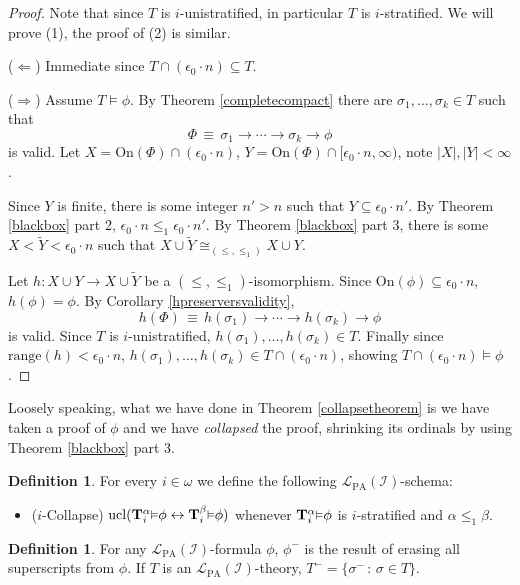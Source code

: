 \documentclass[reqno]{article}
\theoremstyle{definition}
\newtheorem{definition}[theorem]{Definition}
\def\L{\mathscr{L}}
\def\T{\mathbf{T}}
\def\LPA{\L_{\mathrm{PA}}}
\def\indset{\mathcal I}
\def\onset{\mathrm{On}}
\newcommand{\Prr}[2]{\T^{#1}_{#2}\mbox{\small${\vDash}$}}
\newcommand{\ucl}[1]{\mathrm{ucl}(#1)}
\begin{document}
\begin{proof}
Note that since $T$ is $i$-unistratified, in particular $T$ is $i$-stratified.
We will prove (1), the proof of (2) is similar.
\item
($\Leftarrow$) Immediate since $T\cap(\epsilon_0\cdot n)\subseteq T$.

\item
($\Rightarrow$)
Assume $T\models\phi$.
By Theorem \ref{completecompact} there are $\sigma_1,\ldots,\sigma_k\in T$
such that
\[
\Phi \,\equiv\, \sigma_1\rightarrow\cdots\rightarrow \sigma_k\rightarrow\phi
\]
is valid.
Let $X=\onset(\Phi)\cap(\epsilon_0\cdot n)$, $Y=\onset(\Phi)\cap[\epsilon_0\cdot n,\infty)$, note $|X|,|Y|<\infty$.

Since $Y$ is finite, there is some integer $n'>n$ such that $Y\subseteq\epsilon_0\cdot n'$.
By Theorem \ref{blackbox} part 2, $\epsilon_0\cdot n\leq_1\epsilon_0\cdot n'$.
By Theorem \ref{blackbox} part 3, there is some $X<\widetilde Y<\epsilon_0\cdot n$ such that
$X\cup\widetilde Y\cong_{(\leq,\leq_1)}X\cup Y$.

Let $h:X\cup Y\to X\cup\widetilde Y$ be a $(\leq,\leq_1)$-isomorphism.
Since $\onset(\phi)\subseteq\epsilon_0\cdot n$, $h(\phi)=\phi$.
By Corollary \ref{hpreserversvalidity},
\[
h(\Phi)\,\equiv\, h(\sigma_1)\rightarrow\cdots\rightarrow h(\sigma_k)\rightarrow \phi
\]
is valid.
Since $T$ is $i$-unistratified, $h(\sigma_1),\ldots,h(\sigma_k)\in T$.
Finally since $\mathrm{range}(h)<\epsilon_0\cdot n$, $h(\sigma_1),\ldots,h(\sigma_k)\in T\cap(\epsilon_0\cdot n)$,
showing $T\cap(\epsilon_0\cdot n)\models \phi$.
\end{proof}

Loosely speaking, what we have done in Theorem \ref{collapsetheorem} is we have
taken a proof of $\phi$ and we have \emph{collapsed} the proof, shrinking its ordinals
by using Theorem \ref{blackbox} part 3.

\begin{definition}
For every $i\in\omega$ we define the following $\LPA(\indset)$-schema:
\begin{itemize}
\item ($i$-Collapse) $\ucl{\Prr\alpha i\phi\leftrightarrow\Prr\beta i\phi}$ whenever
$\Prr\alpha i\phi$ is $i$-stratified and $\alpha\leq_1\beta$.
\end{itemize}
\end{definition}

\begin{definition}
For any $\LPA(\indset)$-formula $\phi$, $\phi^-$ is the result of erasing 
all superscripts from $\phi$.
If $T$ is an $\LPA(\indset)$-theory, $T^-=\{\sigma^-\,:\,\sigma\in 
T\}$.
\end{definition}
\end{document}
